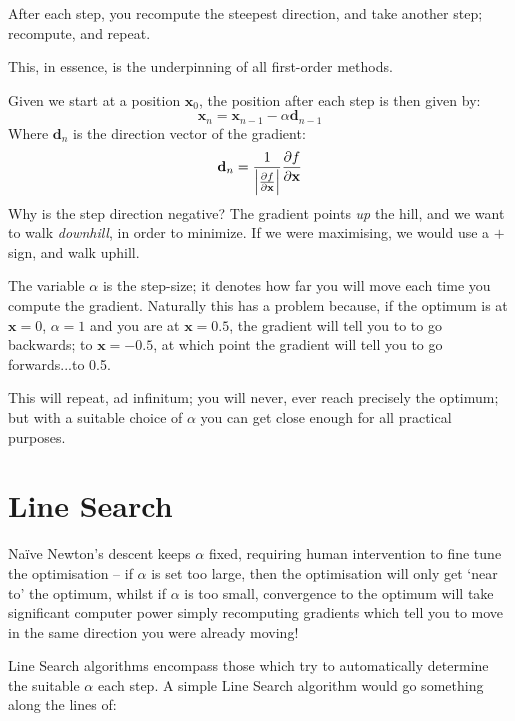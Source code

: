 \documentclass[a4paper,openany,11pt]{book}
\renewcommand\vec[1]{\boldsymbol{\mathbf{#1}}}
\begin{document}
				After each step, you recompute the steepest direction, and take another step; recompute, and repeat. 
	
				This, in essence, is the underpinning of all first-order methods. 
	
				Given we start at a position $\vec{x}_0$, the position after each step is then given by:
				\begin{equation}
					\vec{x}_n = \vec{x}_{n-1} - \alpha \vec{d}_{n-1}
				\end{equation}
				Where $\vec{d}_n$ is the direction vector of the gradient:
				\begin{equation}
					\vec{d}_n = \frac{1}{\left|\pdiv{f}{\vec{x}}\right|} \pdiv{f}{\vec{x}}
				\end{equation}
				Why is the step direction negative? The gradient points \textit{up} the hill, and we want to walk \textit{downhill}, in order to minimize. If we were maximising, we would use a $+$ sign, and walk uphill. 
	
				The variable $\alpha$ is the step-size; it denotes how far you will move each time you compute the gradient. Naturally this has a problem because, if the optimum is at $\vec{x} = 0$, $\alpha = 1$ and you are at $\vec{x} = 0.5$, the gradient will tell you to to go backwards; to $\vec{x} = -0.5$, at which point the gradient will tell you to go forwards...to 0.5.
				
				This will repeat, ad infinitum; you will never, ever reach precisely the optimum; but with a suitable choice of $\alpha$ you can get close enough for all practical purposes.
			
			\section{Line Search}
	
				Na\"ive Newton's descent keeps $\alpha$ fixed, requiring human intervention to fine tune the optimisation -- if $\alpha$ is set too large, then the optimisation will only get `near to' the optimum, whilst if $\alpha$ is too small, convergence to the optimum will take significant computer power simply recomputing gradients which tell you to move in the same direction you were already moving!
				
				Line Search algorithms encompass those which try to automatically determine the suitable $\alpha$ each step. A simple Line Search algorithm would go something along the lines of:
				
\end{document}
